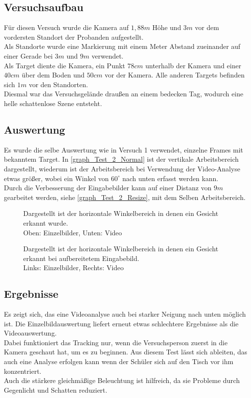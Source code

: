 \subsection{Versuchsaufbau}
Für diesen Versuch wurde die Kamera auf $1,88m$ Höhe und $3m$ vor dem vordersten Standort der Probanden aufgestellt.\\
Als Standorte wurde eine Markierung mit einem Meter Abstand zueinander auf einer Gerade bei $3m$ und $9m$ verwendet.\\
Als Target diente die Kamera, ein Punkt $78cm$ unterhalb der Kamera und einer $40cm$ über dem Boden und $50cm$ vor der Kamera. Alle anderen Targets befinden sich $1m$ vor den Standorten.\\
Diesmal war das Versuchsgelände draußen an einem bedecken Tag, wodurch eine helle schattenlose Szene entsteht.
\subsection{Auswertung}
Es wurde die selbe Auswertung wie in Versuch 1 verwendet, einzelne Frames mit bekanntem Target. In \autoref{graph_Test_2_Normal} ist der vertikale Arbeitsbereich dargestellt, wiederum ist der Arbeitsbereich bei Verwendung der Video-Analyse etwas größer, wobei ein Winkel von $60^\circ$ nach unten erfasst werden kann.\\
Durch die Verbesserung der Eingabebilder kann auf einer Distanz von $9m$ gearbeitet werden, siehe \autoref{graph_Test_2_Resize}, mit dem Selben Arbeitsbereich.
\begin{figure}
	\centering
		
	\caption{Dargestellt ist der horizontale Winkelbereich in denen ein Gesicht erkannt wurde.\\
		Oben: Einzelbilder, Unten: Video}
	\label{graph_Test_2_Normal}
\end{figure}
\begin{figure}
\centering
	
	\caption{Dargestellt ist der horizontale Winkelbereich in denen ein Gesicht erkannt bei aufbereitetem Eingabebild.\\
	Links: Einzelbilder, Rechts: Video}
\label{graph_Test_2_Resize}
\end{figure}
\subsection{Ergebnisse}
Es zeigt sich, das eine Videoanalyse auch bei starker Neigung nach unten möglich ist. Die Einzelbildauswertung liefert erneut etwas schlechtere Ergebnisse als die Videoauswertung.\\
Dabei funktioniert das Tracking nur, wenn die Versuchsperson zuerst in die Kamera geschaut hat, um es zu beginnen. Aus diesem Test lässt sich ableiten, das auch eine Analyse erfolgen kann wenn der Schüler sich auf den Tisch vor ihm konzentriert.\\
Auch die stärkere gleichmäßige Beleuchtung ist hilfreich, da sie Probleme durch Gegenlicht und Schatten reduziert.
